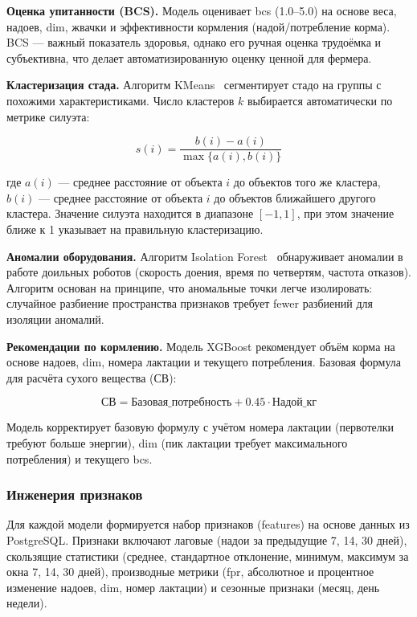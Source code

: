 \textbf{Оценка упитанности (BCS).} Модель оценивает \acrshort{bcs} (1.0--5.0) на основе веса, надоев, \acrshort{dim}, жвачки и эффективности кормления (надой/потребление корма). BCS --- важный показатель здоровья, однако его ручная оценка трудоёмка и субъективна, что делает автоматизированную оценку ценной для фермера.

\textbf{Кластеризация стада.} Алгоритм KMeans~\cite{KMeans} сегментирует стадо на группы с похожими характеристиками. Число кластеров $k$ выбирается автоматически по метрике силуэта:

$$s(i) = \frac{b(i) - a(i)}{\max\{a(i), b(i)\}}$$

где $a(i)$ --- среднее расстояние от объекта $i$ до объектов того же кластера, $b(i)$ --- среднее расстояние от объекта $i$ до объектов ближайшего другого кластера. Значение силуэта находится в диапазоне $[-1, 1]$, при этом значение ближе к 1 указывает на правильную кластеризацию.

\textbf{Аномалии оборудования.} Алгоритм Isolation Forest~\cite{IsolationForest} обнаруживает аномалии в работе доильных роботов (скорость доения, время по четвертям, частота отказов). Алгоритм основан на принципе, что аномальные точки легче изолировать: случайное разбиение пространства признаков требует fewer разбиений для изоляции аномалий.

\textbf{Рекомендации по кормлению.} Модель XGBoost рекомендует объём корма на основе надоев, \acrshort{dim}, номера лактации и текущего потребления. Базовая формула для расчёта сухого вещества (СВ):

$$\text{СВ} = \text{Базовая\_потребность} + 0.45 \cdot \text{Надой\_кг}$$

Модель корректирует базовую формулу с учётом номера лактации (первотелки требуют больше энергии), \acrshort{dim} (пик лактации требует максимального потребления) и текущего \acrshort{bcs}.

\subsubsection{Инженерия признаков}

Для каждой модели формируется набор признаков (features) на основе данных из PostgreSQL. Признаки включают лаговые (надои за предыдущие 7, 14, 30 дней), скользящие статистики (среднее, стандартное отклонение, минимум, максимум за окна 7, 14, 30 дней), производные метрики (\acrshort{fpr}, абсолютное и процентное изменение надоев, \acrshort{dim}, номер лактации) и сезонные признаки (месяц, день недели).

